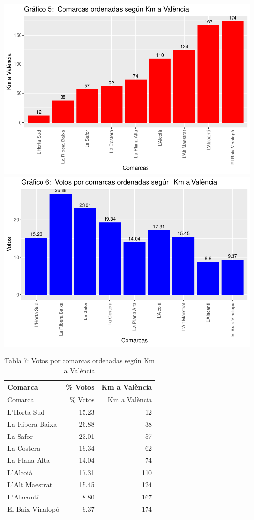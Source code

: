 \documentclass[
]{article}
\begin{document}
\includegraphics{votovalencianista-ea2023_page_files/figure-latex/ordenDistanciacapital-1.pdf}
\includegraphics{votovalencianista-ea2023_page_files/figure-latex/ordenDistanciacapital-2.pdf}

\begin{longtable}[]{@{}lrr@{}}
\caption{Tabla 7: Votos por comarcas ordenadas según Km a
València}\tabularnewline
\toprule\noalign{}
Comarca & \% Votos & Km a València \\
\midrule\noalign{}
\endfirsthead
\toprule\noalign{}
Comarca & \% Votos & Km a València \\
\midrule\noalign{}
\endhead
\bottomrule\noalign{}
\endlastfoot
L'Horta Sud & 15.23 & 12 \\
La Ribera Baixa & 26.88 & 38 \\
La Safor & 23.01 & 57 \\
La Costera & 19.34 & 62 \\
La Plana Alta & 14.04 & 74 \\
L'Alcoià & 17.31 & 110 \\
L'Alt Maestrat & 15.45 & 124 \\
L'Alacantí & 8.80 & 167 \\
El Baix Vinalopó & 9.37 & 174 \\
\end{longtable}
\end{document}

